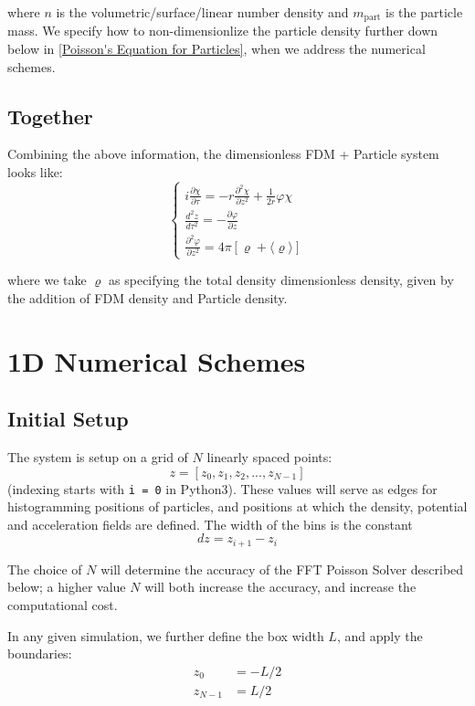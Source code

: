 \documentclass{article}
\newcommand{\pd}{\partial}
\begin{document}
where $n$ is the volumetric/surface/linear number density and $m_{\text{part}}$ is the particle mass. We specify how to non-dimensionlize the particle density further down below in \cref{Poisson's Equation for Particles}, when we address the numerical schemes.
    
\subsection{Together}
Combining the above information, the dimensionless FDM + Particle system looks like:
\begin{equation}
    \begin{cases}
    i\frac{\pd \chi}{\pd \tau} = -r\frac{\pd^2 \chi}{\pd z^2} + \frac{1}{2r}\varphi\chi \\
    
    \frac{d^2 z}{d\tau^2} = -\frac{\pd \varphi}{\pd z}\\
    
    \frac{\pd^2 \varphi}{\pd z^2} = 4\pi \left[{\varrho} +\langle{\varrho}\rangle\right]
    \end{cases}
    \label{FULL-NonDim}
\end{equation}

where we take ${\varrho}$ as specifying the total density dimensionless density, given by the addition of FDM density and Particle density.
\section{1D Numerical Schemes}

\subsection{Initial Setup}
The system is setup on a grid of $N$ linearly spaced points:
$$z = [z_0, z_1, z_2, ..., z_{N-1}]$$
(indexing starts with \texttt{i = 0} in Python3). These values will serve as edges for histogramming positions of particles, and positions at which the density, potential and acceleration fields are defined. The width of the bins is the constant
$$dz = z_{i+1} - z_i$$

The choice of $N$ will determine the accuracy of the FFT Poisson Solver described below; a higher value $N$ will both increase the accuracy, and increase the computational cost. 

In any given simulation, we further define the box width $L$, and apply the boundaries:
\begin{align}
    z_0 &= -L/2 \\ 
    z_{N-1} &= L/2
\end{align}
\end{document}
